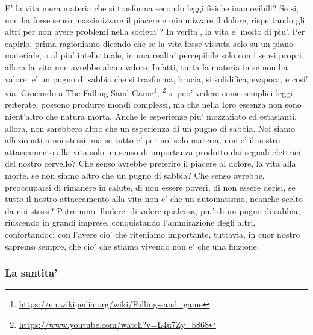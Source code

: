 E' la vita mera materia che si trasforma secondo leggi fisiche inamovibili? Se si, non ha forse senso massimizzare il piacere e minimizzare il dolore, rispettando gli altri per non avere problemi nella societa'? 
In verita', la vita e' molto di piu'. Per capirlo, prima ragioniamo dicendo che se la vita fosse vissuta solo su un piano materiale, o al piu' intellettuale, in una realta' percepibile solo con i sensi propri, allora la vita non avrebbe alcun valore.
Infatti, tutta la materia in se non ha valore, e' un pugno di sabbia che si trasforma, brucia, si solidifica, evapora, e cosi' via. Giocando a The Falling Sand Game\footnote{\url{https://en.wikipedia.org/wiki/Falling-sand_game}}, \footnote{\url{https://www.youtube.com/watch?v=L4u7Zy_b868}} si puo' vedere come semplici leggi, reiterate, possono produrre mondi complessi, ma che nella loro essenza non sono nient'altro che natura morta. Anche le esperienze piu' mozzafiato ed estasianti, allora, non sarebbero altro che un'esperienza di un pugno di sabbia.
Noi siamo affezionati a noi stessi, ma se tutto e' per noi solo materia, non e' il nostro attaccamento alla vita solo un senso di importanza prodotto dai segnali elettrici del nostro cervello? Che senso avrebbe preferire il piacere al dolore, la vita alla morte, se non siamo altro che un pugno di sabbia? Che senso avrebbe, preoccuparsi di rimanere in salute, di non essere poveri, di non essere derisi, se tutto il nostro attaccamento alla vita non e' che un automatismo, neanche scelto da noi stessi?
Potremmo illuderci di valere qualcosa, piu' di un pugno di sabbia, riuscendo in grandi imprese, conquistando l'ammirazione degli altri, confortandoci con l'avere cio' che riteniamo importante, tuttavia, in cuor nostro sapremo sempre, che cio' che stiamo vivendo non e' che una finzione.

\subsubsection{La santita'}

